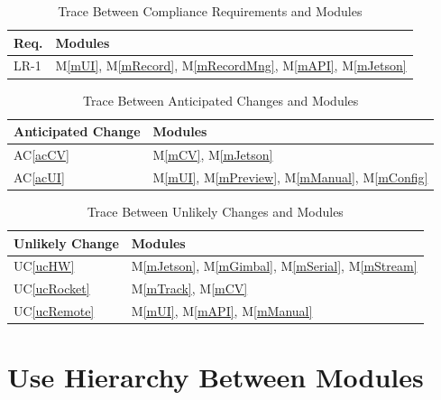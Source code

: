 \documentclass[12pt, titlepage]{article}
\newcommand{\acref}[1]{AC\ref{#1}}
\newcommand{\uref}[1]{UC\ref{#1}}
\newcommand{\mref}[1]{M\ref{#1}}
\begin{document}
\begin{table}[H]
  \centering
  \begin{tabular}{p{} p{}}
    \toprule
    \textbf{Req.} & \textbf{Modules}                                                           \\
    \midrule
    LR-1          & \mref{mUI}, \mref{mRecord}, \mref{mRecordMng}, \mref{mAPI}, \mref{mJetson} \\
    \bottomrule
  \end{tabular}
  \caption{Trace Between Compliance Requirements and Modules}
  \label{TblComplianceModules}
\end{table}

\begin{table}[H]
  \centering
  \begin{tabular}{p{} p{}}
    \toprule
    \textbf{Anticipated Change} & \textbf{Modules}                                            \\
    \midrule
    \acref{acCV}                & \mref{mCV}, \mref{mJetson}                                  \\
    \acref{acUI}                & \mref{mUI}, \mref{mPreview}, \mref{mManual}, \mref{mConfig} \\
    \bottomrule
  \end{tabular}
  \caption{Trace Between Anticipated Changes and Modules}
  \label{TblACModules}
\end{table}

\begin{table}[H]
  \centering
  \begin{tabular}{p{} p{}}
    \toprule
    \textbf{Unlikely Change} & \textbf{Modules}                                               \\
    \midrule
    \uref{ucHW}              & \mref{mJetson}, \mref{mGimbal}, \mref{mSerial}, \mref{mStream} \\
    \uref{ucRocket}          & \mref{mTrack}, \mref{mCV}                                      \\
    \uref{ucRemote}          & \mref{mUI}, \mref{mAPI}, \mref{mManual}                        \\
    \bottomrule
  \end{tabular}
  \caption{Trace Between Unlikely Changes and Modules}
  \label{TblUCModules}
\end{table}

\section{Use Hierarchy Between Modules} \label{SecUse}
\end{document}
